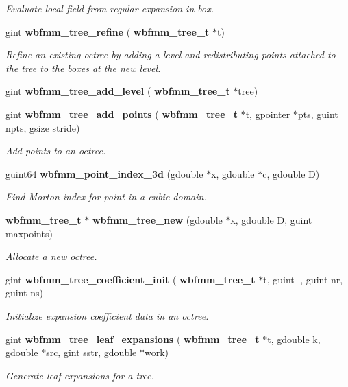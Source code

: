 \begin{DoxyCompactItemize}
\begin{DoxyCompactList}\small\item\em Evaluate local field from regular expansion in box. \end{DoxyCompactList}\item 
gint \textbf{ wbfmm\+\_\+tree\+\_\+refine} (\textbf{ wbfmm\+\_\+tree\+\_\+t} $\ast$t)
\begin{DoxyCompactList}\small\item\em Refine an existing octree by adding a level and redistributing points attached to the tree to the boxes at the new level. \end{DoxyCompactList}\item 
gint \textbf{ wbfmm\+\_\+tree\+\_\+add\+\_\+level} (\textbf{ wbfmm\+\_\+tree\+\_\+t} $\ast$tree)
\item 
gint \textbf{ wbfmm\+\_\+tree\+\_\+add\+\_\+points} (\textbf{ wbfmm\+\_\+tree\+\_\+t} $\ast$t, gpointer $\ast$pts, guint npts, gsize stride)
\begin{DoxyCompactList}\small\item\em Add points to an octree. \end{DoxyCompactList}\item 
guint64 \textbf{ wbfmm\+\_\+point\+\_\+index\+\_\+3d} (gdouble $\ast$x, gdouble $\ast$c, gdouble D)
\begin{DoxyCompactList}\small\item\em Find Morton index for point in a cubic domain. \end{DoxyCompactList}\item 
\textbf{ wbfmm\+\_\+tree\+\_\+t} $\ast$ \textbf{ wbfmm\+\_\+tree\+\_\+new} (gdouble $\ast$x, gdouble D, guint maxpoints)
\begin{DoxyCompactList}\small\item\em Allocate a new octree. \end{DoxyCompactList}\item 
gint \textbf{ wbfmm\+\_\+tree\+\_\+coefficient\+\_\+init} (\textbf{ wbfmm\+\_\+tree\+\_\+t} $\ast$t, guint l, guint nr, guint ns)
\begin{DoxyCompactList}\small\item\em Initialize expansion coefficient data in an octree. \end{DoxyCompactList}\item 
gint \textbf{ wbfmm\+\_\+tree\+\_\+leaf\+\_\+expansions} (\textbf{ wbfmm\+\_\+tree\+\_\+t} $\ast$t, gdouble k, gdouble $\ast$src, gint sstr, gdouble $\ast$work)
\begin{DoxyCompactList}\small\item\em Generate leaf expansions for a tree. \end{DoxyCompactList}\item 

\end{DoxyCompactItemize}
